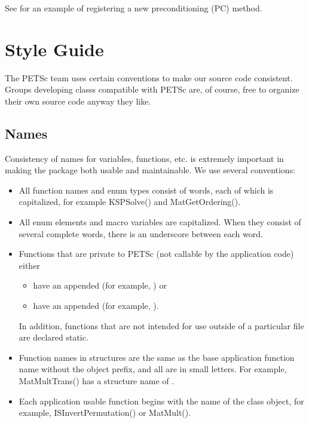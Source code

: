 \documentclass[twoside,12pt]{../sty/report_petsc}
\begin{document}
See  for an example of registering a new
preconditioning (PC) method.


\chapter{Style Guide}

The PETSc team uses certain conventions to make our source code consistent. Groups
developing classs compatible with PETSc are, of course, free to organize their
own source code anyway they like.

\section{Names}
Consistency of names for variables, functions, etc. is extremely 
important in making the package both usable and maintainable.
We use several conventions:
\begin{itemize}
\item All function names and enum types consist of words, each of 
      which is capitalized, for example KSPSolve() and 
      MatGetOrdering().
\item All enum elements and macro variables are capitalized. When
      they consist of several complete words, there is an underscore between each word.
\item Functions that are private to PETSc (not callable by the 
      application code) either
      \begin{itemize}
        \item have an appended  (for example, 
           ) or
        \item have an appended  (for example,
           ).
      \end{itemize}

      In addition, functions that are not intended for use outside
      of a particular file are declared static.
\item Function names in structures are the same as the base application
      function name without the object prefix, and all are in small letters. 
      For example, MatMultTrans() has a structure name of 
      .
\item Each application usable function begins with the name of the class object, 
      for example, ISInvertPermutation() or MatMult(). 
\end{itemize}
\end{document}
